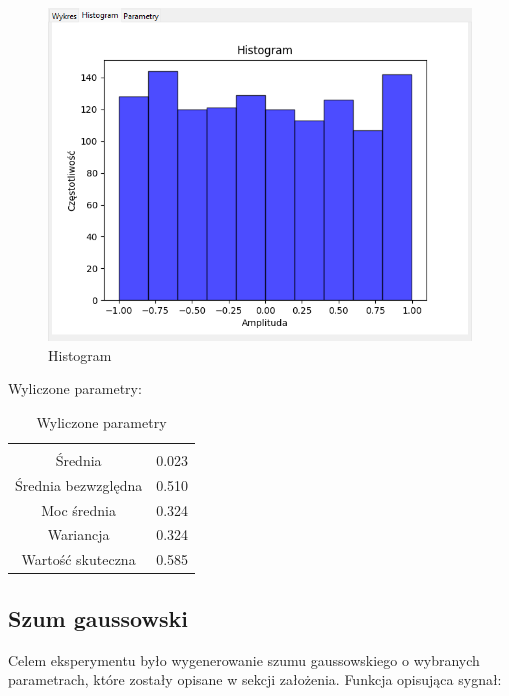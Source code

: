 \documentclass{article}
\begin{document}
    \begin{figure}[h!]
        \centering
        \includegraphics[width=\textwidth]{img/szum-jednost/hist.png}
        \caption{Histogram}
    \end{figure}
    \FloatBarrier
    Wyliczone parametry:
    \begin{table}[h!]
        \centering
        \vspace{0.2cm}
        \begin{tabular}{|c|c|}
            \hline\hline\\[-0.4cm]
            Średnia & 0.023  \\
            \hline
            Średnia bezwzględna & 0.510  \\
            \hline
            Moc średnia & 0.324  \\
            \hline
            Wariancja & 0.324 \\
            \hline
            Wartość skuteczna & 0.585 \\
            \hline
        \end{tabular}
        \caption{Wyliczone parametry}
        \label{szumjednostajny}
    \end{table}

\subsection{Szum gaussowski} \label{szumgaussowski} 
        Celem eksperymentu było wygenerowanie szumu gaussowskiego o wybranych parametrach,
        które zostały opisane w sekcji założenia. Funkcja opisująca sygnał:
\end{document}
